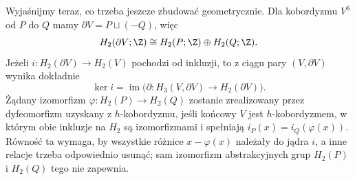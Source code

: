 Wyjaśnijmy teraz, co trzeba jeszcze
zbudować geometrycznie. Dla kobordyzmu
$V^6$ od $P$ do $Q$ mamy
$\partial V=P\sqcup(-Q)$, więc
\[
H_2(\partial V;\Z)
 \cong H_2(P;\Z)\oplus H_2(Q;\Z).
\]
Jeżeli $i\colon H_2(\partial V)\to H_2(V)$
pochodzi od inkluzji, to z ciągu pary
$(V,\partial V)$ wynika dokładnie
\[
\ker i=\operatorname{im}\bigl(
\partial\colon H_3(V,\partial V)
\longrightarrow H_2(\partial V)\bigr).
\]
Żądany izomorfizm
$\varphi\colon H_2(P)\to H_2(Q)$
zostanie zrealizowany przez dyfeomorfizm
uzyskany z $h$-kobordyzmu, jeśli końcowy
$V$ jest $h$-kobordyzmem, w którym
obie inkluzje na $H_2$ są izomorfizmami
i spełniają $i_P(x)=i_Q(\varphi(x))$.
Równość ta wymaga, by wszystkie różnice
$x-\varphi(x)$ należały do jądra $i$,
a inne relacje trzeba odpowiednio usunąć;
sam izomorfizm abstrakcyjnych grup
$H_2(P)$ i $H_2(Q)$ tego nie zapewnia.

